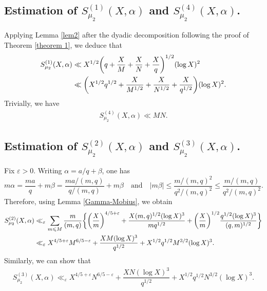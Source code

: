 \documentclass[11pt]{amsart}
\numberwithin{equation}{section}
\numberwithin{figure}{section}
\theoremstyle{definition}
\begin{document}
\subsection{Estimation of $S_{\mu_2}^{(1)}(X, \alpha)$ and $S_{\mu_2}^{(4)}(X, \alpha)$.} Applying Lemma \ref{lem2} after the dyadic decomposition following the proof of Theorem \ref{theorem 1}, we deduce that
\begin{align}\notag 
S_{\mu_2}^{(1)}(X, \alpha)&\ll X^{1/2}\bigg(q+\dfrac{X}{M} + \dfrac{X}{N} + \dfrac{X}{q}\bigg)^{1/2}(\log X)^2\\
&\ll \bigg(X^{1/2}q^{1/2}+\dfrac{X}{M^{1/2}} + \dfrac{X}{N^{1/2}} + \dfrac{X}{q^{1/2}}\bigg)(\log X)^2 \label{S_1 bound}.
\end{align}
Trivially, we have
\begin{align}
S_{\mu_2}^{(4)}(X, \alpha) \ll  MN. \label{S_4 bound}
\end{align}
\subsection{Estimation of $S_{\mu_2}^{(2)}(X, \alpha)$ and $S_{\mu_2}^{(3)}(X, \alpha)$.}  Fix $\varepsilon>0$. Writing $\alpha = a/q + \beta$, one has
\[m\alpha = \dfrac{ma}{q} + m\beta = \dfrac{ma/(m, q)}{q/(m, q)} + m\beta \quad \text{and}\quad |m\beta|\leqslant\dfrac{m/(m, q)^2}{q^2/(m, q)^2} \leqslant\dfrac{m/(m, q)}{q^2/(m, q)^2}.\]
Therefore, using Lemma \eqref{Gamma-Mobius}, we obtain
\begin{align}
    \notag  S_{\mu_2}^{(2)}(X, \alpha) & \ll_{\varepsilon} \sum_{m\leqslant M}\dfrac{m}{(m, q)}\bigg\{\bigg(\dfrac{X}{m}\bigg)^{4/5+\varepsilon} + \dfrac{X(m, q)^{1/2}(\log X)^3}{mq^{1/2}} + \bigg(\dfrac{X}{m}\bigg)^{1/2}\dfrac{q^{1/2}(\log X)^3}{(q, m)^{1/2}}\bigg \} \\
    &\ll_{\varepsilon} X^{4/5+\varepsilon}M^{6/5-\varepsilon} + \dfrac{XM(\log X)^3}{q^{1/2}} + X^{1/2}q^{1/2}M^{3/2}(\log X)^3. \label{S_2 Bound}
\end{align}
Similarly, we can show that
\begin{align}
    S_{\mu_2}^{(3)}(X, \alpha)\ll_{\varepsilon}  X^{4/5+\varepsilon}N^{6/5-\varepsilon} + \dfrac{XN(\log X)^3}{q^{1/2}} + X^{1/2}q^{1/2}N^{3/2}(\log X)^3. \label{S_3 bound}
\end{align}
\end{document}
